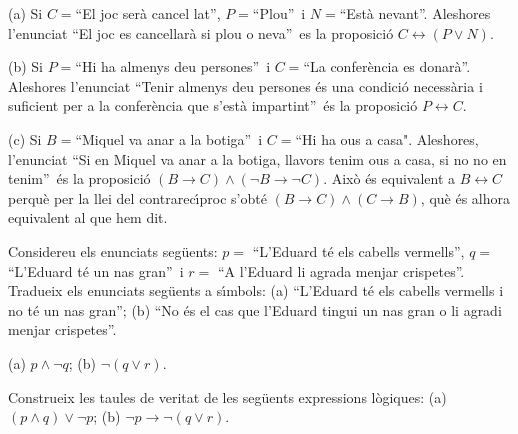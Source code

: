 \begin{solucio}
(a) Si $C=$\textquotedblleft El joc ser\`{a} cancel\textperiodcentered
lat\textquotedblright, $P=$\textquotedblleft Plou\textquotedblright\ i
$N=$\textquotedblleft Est\`{a} nevant\textquotedblright. Aleshores l'enunciat
\textquotedblleft El joc es cancel\textperiodcentered lar\`{a} si plou o
neva\textquotedblright\ es la proposici\'{o} $C\leftrightarrow(P\vee N)$.

(b) Si $P=$\textquotedblleft Hi ha almenys deu persones\textquotedblright\ i
$C=$\textquotedblleft La confer\`{e}ncia es donar\`{a}\textquotedblright.
Aleshores l'enunciat \textquotedblleft Tenir almenys deu persones \'{e}s una
condici\'{o} necess\`{a}ria i suficient per a la confer\`{e}ncia que
s'est\`{a} impartint\textquotedblright\ \'{e}s la proposici\'{o}
$P\longleftrightarrow C$.

(c) Si $B=$\textquotedblleft Miquel va anar a la botiga\textquotedblright\ i
$C=$\textquotedblleft Hi ha ous a casa". Aleshores, l'enunciat
\textquotedblleft Si en Miquel va anar a la botiga, llavors tenim ous a casa,
si no no en tenim\textquotedblright\ \'{e}s la proposici\'{o} $(B\rightarrow
C)\wedge(\lnot B\rightarrow\lnot C)$. Aix\`{o} \'{e}s equivalent a
$B\longleftrightarrow C$ perqu\`{e} per la llei del contrarec\'{\i}proc
s'obt\'{e} $(B\rightarrow C)\wedge(C\rightarrow B)$, qu\`{e} \'{e}s alhora
equivalent al que hem dit.
\end{solucio}

\begin{exer}
Considereu els enunciats seg\"{u}ents: $p=$ \textquotedblleft L'Eduard t\'{e}
els cabells vermells\textquotedblright, $q=$ \textquotedblleft L'Eduard t\'{e}
un nas gran\textquotedblright\ i $r=$ \textquotedblleft A l'Eduard li agrada
menjar crispetes\textquotedblright. Tradueix els enunciats seg\"{u}ents a
s\'{\i}mbols: (a) \textquotedblleft L'Eduard t\'{e} els cabells vermells i no
t\'{e} un nas gran\textquotedblright; (b) \textquotedblleft No \'{e}s el cas
que l'Eduard tingui un nas gran o li agradi menjar crispetes\textquotedblright.
\end{exer}

\begin{solucio}
(a) $p\wedge\lnot q$; (b) $\lnot(q\vee r)$.
\end{solucio}

\begin{exer}
Construeix les taules de veritat de les seg\"{u}ents expressions l\`{o}giques:
(a) $(p\wedge q)\vee\lnot p$; (b) $\lnot p\longrightarrow\lnot(q\vee r)$.
\end{exer}

